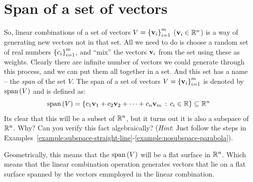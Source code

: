\section{Span of a set of vectors}
So, linear combinations of a set of vectors $V = \left\{ \mathbf{v}_i \right\}_{i=1}^{m}$ ($\mathbf{v}_i \in \mathbb{R}^n$) is a way of generating new vectors not in that set. All we need to do is choose a random set of real numbers $\left\{ c_i \right\}_{i=1}^{m}$, and ``mix'' the vectors $\mathbf{v}_i$ from the set using these as weights. Clearly there are infinite number of vectors we could generate through this process, and we can put them all together in a set. And this set has a name -- the \textit{span} of the set $V$. The span of a set of vectors $V = \left\{ \mathbf{v}_i \right\}_{i=1}^{m}$ is denoted by $\text{span}\left( V \right)$ and is defined as:
\begin{equation}
    \text{span}\left( V \right) = \left\{ c_1 \mathbf{v}_1 + c_2 \mathbf{v}_2 + \cdots + c_n \mathbf{v}_m \, : \, c_i \in \mathbb{R} \right\} \subseteq \mathbb{R}^n
    \label{eq:span-vec}
\end{equation}
Its clear that this will be a subset of $\mathbb{R}^n$, but it turns out it is also a subspace of $\mathbb{R}^n$. Why? Can you verify this fact algebraically? (\textit{Hint}: Just follow the steps in Examples~\ref{example:subspace-straight-line}-\ref{example:nosubspace-parabola}).

Geometrically, this means that the $\text{span}\left( V\right)$ will be a flat surface in $\mathbb{R}^n$. Which means that the linear combination operation generates vectors that lie on a flat surface spanned by the vectors emmployed in the linear combination.

